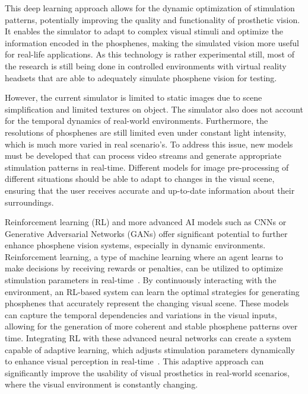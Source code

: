 \documentclass[10pt]{article}
\begin{document}
This deep learning approach allows for the dynamic optimization of stimulation
patterns, potentially improving the quality and functionality of prosthetic
vision. It enables the simulator to adapt to complex visual stimuli and optimize
the information encoded in the phosphenes, making the simulated vision more
useful for real-life applications. As this technology is rather experimental
still, most of the research is still being done in controlled environments with
virtual reality headsets that are able to adequately simulate phosphene vision
for testing.

However, the current simulator is limited to static images due to scene
simplification and limited textures on object. The simulator also does not account for the temporal dynamics of real-world
environments. Furthermore, the resolutions of phosphenes are still limited even
under constant light intensity, which is much more varied in real scenario's. To
address this issue, new models must be developed that can process video streams
and generate appropriate stimulation patterns in real-time. Different models for
image pre-processing of different situations should be able to adapt to changes
in the visual scene, ensuring that the user receives accurate and up-to-date
information about their surroundings.

Reinforcement learning (RL) and more advanced AI models such as CNNs or
Generative Adversarial Networks (GANs) offer significant potential to further
enhance phosphene vision systems, especially in dynamic environments.
Reinforcement learning, a type of machine learning where an agent learns to make
decisions by receiving rewards or penalties, can be utilized to optimize
stimulation parameters in
real-time~\parencite{tiwariObjectIdentificationModel2021,mohammedReviewDeepReinforcement2020,fahimiGenerativeAdversarialNetworksBased2021}.
By continuously interacting with the environment, an RL-based system can learn
the optimal strategies for generating phosphenes that accurately represent the
changing visual scene. These models can capture the temporal dependencies and
variations in the visual inputs, allowing for the generation of more coherent
and stable phosphene patterns over time. Integrating RL with these advanced
neural networks can create a system capable of adaptive learning, which adjusts
stimulation parameters dynamically to enhance visual perception in
real-time~\parencite{hanDeepLearningBased2021}. This adaptive approach can
significantly improve the usability of visual prosthetics in real-world
scenarios, where the visual environment is constantly changing.
\end{document}
